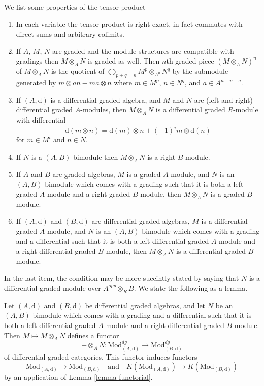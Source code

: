 \medskip\noindent
We list some properties of the tensor product
\begin{enumerate}
\item In each variable the tensor product is right exact, in fact commutes
with direct sums and arbitrary colimits.
\item If $A$, $M$, $N$ are graded and the module structures are compatible
with gradings then $M \otimes_A N$ is graded as well.
Then $n$th graded piece $(M \otimes_A N)^n$ of $M \otimes_A N$
is the quotient of $\bigoplus_{p + q = n} M^p \otimes_{A^0} N^q$
by the submodule generated by $m \otimes an - ma \otimes n$ where
$m \in M^p$, $n \in N^q$, and $a \in A^{n - p - q}$.
\item If $(A, \text{d})$ is a differential graded algebra, and
$M$ and $N$ are (left and right) differential graded $A$-modules, then
$M \otimes_A N$ is a differential graded $R$-module with differential
$$
\text{d}(m \otimes n) = \text{d}(m) \otimes n + (-1)^im \otimes \text{d}(n)
$$
for $m \in M^i$ and $n \in N$.
\item If $N$ is a $(A, B)$-bimodule then $M \otimes_A N$ is a right
$B$-module.
\item If $A$ and $B$ are graded algebras,
$M$ is a graded $A$-module, and $N$ is an $(A, B)$-bimodule
which comes with a grading such that it is both
a left graded $A$-module and a right graded
$B$-module, then $M \otimes_A N$ is a graded $B$-module.
\item If $(A, \text{d})$ and $(B, \text{d})$ are differential graded algebras,
$M$ is a differential graded $A$-module, and $N$ is an $(A, B)$-bimodule
which comes with a grading and a differential such that it is both
a left differential graded $A$-module and a right differential graded
$B$-module, then $M \otimes_A N$ is a differential graded $B$-module.
\end{enumerate}
In the last item, the condition may be more succintly stated by saying
that $N$ is a differential graded module over $A^{opp} \otimes_R B$.
We state the following as a lemma.

\begin{lemma}
\label{lemma-tensor}
Let $(A, \text{d})$ and $(B, \text{d})$ be differential graded algebras,
and let $N$ be an $(A, B)$-bimodule which comes with a grading and a
differential such that it is both a left differential graded $A$-module
and a right differential graded $B$-module. Then
$M \mapsto M \otimes_A N$ defines a functor
$$
- \otimes_A N :
\text{Mod}^{dg}_{(A, \text{d})}
\longrightarrow
\text{Mod}^{dg}_{(B, \text{d})}
$$
of differential graded categories. This functor induces functors
$$
\text{Mod}_{(A, \text{d})} \to \text{Mod}_{(B, \text{d})}
\quad\text{and}\quad
K(\text{Mod}_{(A, \text{d})}) \to K(\text{Mod}_{(B, \text{d})})
$$
by an application of Lemma \ref{lemma-functorial}.
\end{lemma}

